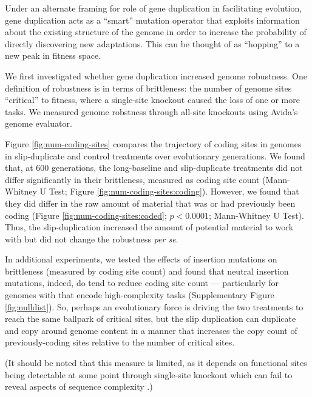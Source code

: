 Under an alternate framing for role of gene duplication in facilitating evolution, gene duplication acts as a ``smart'' mutation operator that exploits information about the existing structure of the genome in order to increase the probability of directly discovering new adaptations.
This can be thought of as ``hopping'' to a new peak in fitness space.

We first investigated whether gene duplication increased genome robustness.
One definition of robustness is in terms of brittleness: the number of genome sites ``critical'' to fitness, where a single-site knockout caused the loss of one or more tasks.
We measured genome robstness through all-site knockouts using Avida's genome evaluator.



Figure \ref{fig:num-coding-sites} compares the trajectory of coding sites in genomes in slip-duplicate and control treatments over evolutionary generations.
We found that, at 600 generations, the long-baseline and slip-duplicate treatments did not differ significantly in their brittleness, measured as coding site count (Mann-Whitney U Test; Figure \ref{fig:num-coding-sites:coding}).
However, we found that they did differ in the raw amount of material that was or had previously been coding (Figure \ref{fig:num-coding-sites:coded}; $p < 0.0001$; Mann-Whitney U Test).
Thus, the slip-duplication increased the amount of potential material to work with but did not change the robustness \textit{per se}.

In additional experiments, we tested the effects of insertion mutations on brittleness (measured by coding site count) and found that neutral insertion mutations, indeed, do tend to reduce coding site count --- particularly for genomes with that encode high-complexity tasks (Supplementary Figure \ref{fig:nulldist}).
So, perhaps an evolutionary force is driving the two treatments to reach the same ballpark of critical sites, but the slip duplication can duplicate and copy around genome content in a manner that increases the copy count of previously-coding sites relative to the number of critical sites.

(It should be noted that this measure is limited, as it depends on functional sites being detectable at some point through single-site knockout which can fail to reveal aspects of sequence complexity \citep{alifeextendedabstract}.)

